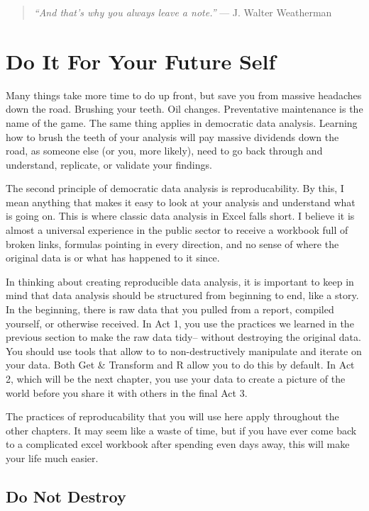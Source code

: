 \documentclass[
]{book}
\begin{document}
\begin{quote}
\emph{``And that's why you always leave a note.''} --- J. Walter Weatherman
\end{quote}

\hypertarget{do-it-for-your-future-self}{%
\section{Do It For Your Future Self}\label{do-it-for-your-future-self}}

Many things take more time to do up front, but save you from massive headaches down the road. Brushing your teeth. Oil changes. Preventative maintenance is the name of the game. The same thing applies in democratic data analysis. Learning how to brush the teeth of your analysis will pay massive dividends down the road, as someone else (or you, more likely), need to go back through and understand, replicate, or validate your findings.

The second principle of democratic data analysis is reproducability. By this, I mean anything that makes it easy to look at your analysis and understand what is going on. This is where classic data analysis in Excel falls short. I believe it is almost a universal experience in the public sector to receive a workbook full of broken links, formulas pointing in every direction, and no sense of where the original data is or what has happened to it since.

In thinking about creating reproducible data analysis, it is important to keep in mind that data analysis should be structured from beginning to end, like a story. In the beginning, there is raw data that you pulled from a report, compiled yourself, or otherwise received. In Act 1, you use the practices we learned in the previous section to make the raw data tidy-- without destroying the original data. You should use tools that allow to to non-destructively manipulate and iterate on your data. Both Get \& Transform and R allow you to do this by default. In Act 2, which will be the next chapter, you use your data to create a picture of the world before you share it with others in the final Act 3.

The practices of reproducability that you will use here apply throughout the other chapters. It may seem like a waste of time, but if you have ever come back to a complicated excel workbook after spending even days away, this will make your life much easier.

\hypertarget{do-not-destroy}{%
\subsection{Do Not Destroy}\label{do-not-destroy}}
\end{document}
